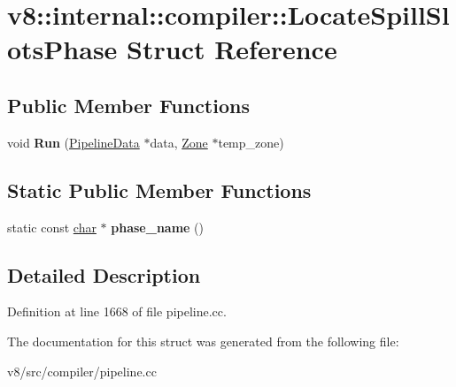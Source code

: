 \hypertarget{structv8_1_1internal_1_1compiler_1_1LocateSpillSlotsPhase}{}\section{v8\+:\+:internal\+:\+:compiler\+:\+:Locate\+Spill\+Slots\+Phase Struct Reference}
\label{structv8_1_1internal_1_1compiler_1_1LocateSpillSlotsPhase}
\subsection*{Public Member Functions}
\begin{DoxyCompactItemize}
\item 
\mbox{\label{structv8_1_1internal_1_1compiler_1_1LocateSpillSlotsPhase_a56ee75c7145a30b570027f85a1a22bf7}} 
void {\bfseries Run} (\mbox{\hyperlink{classv8_1_1internal_1_1compiler_1_1PipelineData}{Pipeline\+Data}} $\ast$data, \mbox{\hyperlink{classv8_1_1internal_1_1Zone}{Zone}} $\ast$temp\+\_\+zone)
\end{DoxyCompactItemize}
\subsection*{Static Public Member Functions}
\begin{DoxyCompactItemize}
\item 
\mbox{\label{structv8_1_1internal_1_1compiler_1_1LocateSpillSlotsPhase_a67ca95aeb20e3c7f383359db82aa853a}} 
static const \mbox{\hyperlink{classchar}{char}} $\ast$ {\bfseries phase\+\_\+name} ()
\end{DoxyCompactItemize}


\subsection{Detailed Description}


Definition at line 1668 of file pipeline.\+cc.



The documentation for this struct was generated from the following file\+:\begin{DoxyCompactItemize}
\item 
v8/src/compiler/pipeline.\+cc\end{DoxyCompactItemize}
